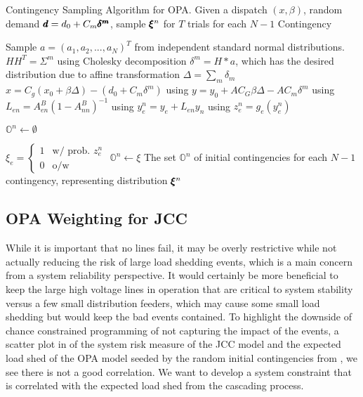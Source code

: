 \begin{algorithm}
\caption[Contingency sampling algorithm for OPA]{Contingency Sampling Algorithm for OPA.  Given a dispatch $(x, \beta)$, random demand $\pmb{d}=d_0 + C_m \pmb{\delta^m}$, sample $\pmb{\xi}^n$ for $T$ trials for each $N-1$ Contingency }\label{opa_sample_alg}
\begin{algorithmic}
\State Sample $a=(a_1,a_2,...,a_N)^T$ from independent standard normal distributions.
\State $H H^T = \Sigma^m$ using Cholesky decomposition
\State $\delta^m = H * a$, which has the desired distribution due to affine transformation
\State $\Delta = \sum_m \delta_m$
\State $x=C_g(x_0 + \beta \Delta)  -(d_0 + C_m \delta^m)$ using  
\State $y=y_0 + A C_G \beta \Delta - A C_m \delta^m$ using 
\State $L_{e n} = A^B_{en}(1-A^B_{nn})^{-1}$ using 
\State $y_e^n = y_e + L_{e n} y_n$  using 
\State $z_e^n = g_e (y_e^n)$

\State $\mathbb{O}^n \gets \emptyset$

\State $\xi_e = 
\left\{ 
\begin{array}{lr}
  1 & \mbox{w/ prob. } z_e^n \\
  0 & \mbox{o/w }
\end{array}
\right. $ 
\EndFor
\State $\mathbb{O}^n \gets \xi$
\EndFor
\EndFor
\EndFor
\State The set $\mathbb{O}^n$ of initial contingencies for each $N-1$ contingency, representing distribution $\pmb{\xi}^n$
\EndProcedure
\end{algorithmic}
\end{algorithm}





\subsection{OPA Weighting for JCC}


While it is important that no lines fail, it may be overly restrictive while not actually reducing the risk of large load shedding events, which is a main concern from a system reliability perspective. It would certainly be more beneficial to keep the large high voltage lines in operation that are critical to system stability versus a few small distribution feeders, which may cause some small load shedding but would keep the bad events contained.  To highlight the downside of chance constrained programming of not capturing the impact of the events,  a scatter plot in   of the system risk measure of the JCC model and the expected load shed of the OPA model seeded by the random initial contingencies from , we see there is not a good correlation.  We want to develop a system constraint that is correlated with the expected load shed from the cascading process.


